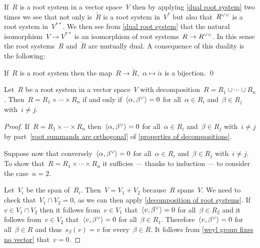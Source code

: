\begin{remark}
  If~$R$ is a root system in a vector space~$V$ then by applying \cref{dual root system} two times we see that not only is~$\check{R}$ is a root system in~$V^*$ but also that~$\dcheck{R}$ is a root system in~$V^{**}$.
  We then see from \cref{dual root system} that the natural isomorphism~$V \to V^{**}$ is an isomorphism of root systems~$R \to \dcheck{R}$.
  In this sense the root systems~$R$ and~$\check{R}$ are mutually dual.
  A consequence of this duality is the following:
\end{remark}


\begin{corollary}
  If~$R$ is a root system then the map~$R \to \check{R}$,~$\alpha \mapsto \check{\alpha}$ is a bijection.
  \qed
\end{corollary}


\begin{corollary}
  Let~$R$ be a root system in a vector space~$V$ with decomposition~$R = R_1 \cup \dotsb \cup R_n$.
  Then~$R = R_1 \times \dotsb \times R_n$ if and only if~$\pair{\alpha, \check{\beta}} = 0$ for all~$\alpha \in R_i$ and~$\beta \in R_j$ with~$i \neq j$.
\end{corollary}


\begin{proof}
  If~$R = R_1 \times \dotsb \times R_n$ then~$\pair{\alpha, \check{\beta}} = 0$ for all~$\alpha \in R_i$ and~$\beta \in R_j$ with~$i \neq j$ by part~\ref*{root summands are orthogonal} of \cref{properties of decompositions}.
  
  Suppose now that conversely~$\pair{\alpha, \check{\beta}} = 0$ for all~$\alpha \in R_i$ and~$\beta \in R_j$ with~$i \neq j$.
  To show that~$R = R_1 \times \dotsb \times R_n$ it sufficies --- thanks to induction --- to consider the case~$n = 2$.
  
  Let~$V_i$ be the span of~$R_i$.
  Then~$V = V_1 + V_2$ because~$R$ spans~$V$.
  We need to check that~$V_1 \cap V_2 = 0$, as we can then apply \cref{decomposition of root systems}.
  If~$v \in V_1 \cap V_2$ then it follows from~$v \in V_1$ that~$\pair{v, \check{\beta}} = 0$ for all~$\beta \in R_2$ and it follows from~$v \in V_2$ that~$\pair{v, \check{\beta}} = 0$ for all~$\beta \in R_1$.
  Therefore~$\pair{v, \check{\beta}} = 0$ for all~$\beta \in R$ and thus~$s_\beta(v) = v$ for every~$\beta \in R$.
  It follows from \cref{weyl group fixes no vector} that~$v = 0$.
\end{proof}




